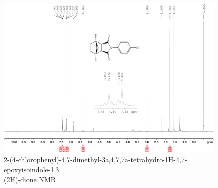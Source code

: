 \documentclass[11pt]{article}
\begin{document}
\begin{figure}[H]
    \centering
    \includegraphics[scale=0.105]{spectra/nmr9.3.png}
    \caption{2-(4-chlorophenyl)-4,7-dimethyl-3a,4,7,7a-tetrahydro-1H-4,7-epoxyisoindole-1,3\\(2H)-dione NMR}
\end{figure}

\newpage
\end{document}
